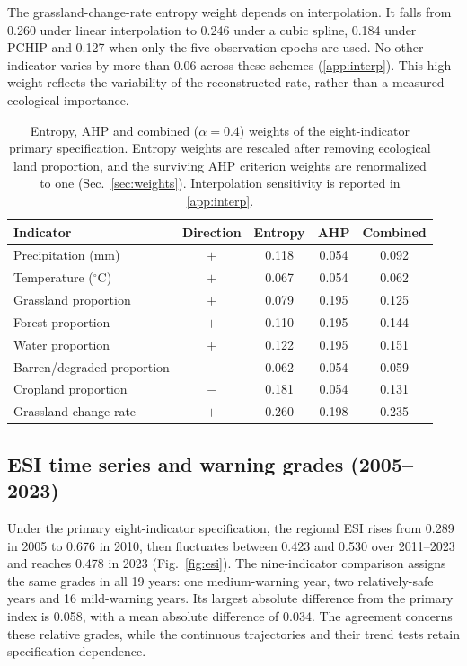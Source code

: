 \documentclass[preprint,11pt,authoryear]{elsarticle}
\begin{document}
The grassland-change-rate entropy weight depends on interpolation. It falls from 0.260 under linear interpolation to 0.246 under a cubic spline, 0.184 under PCHIP and 0.127 when only the five observation epochs are used. No other indicator varies by more than 0.06 across these schemes (\ref{app:interp}). This high weight reflects the variability of the reconstructed rate, rather than a measured ecological importance.

\begin{table}[htbp]
\centering
\caption{Entropy, AHP and combined ($\alpha=0.4$) weights of the eight-indicator primary specification. Entropy weights are rescaled after removing ecological land proportion, and the surviving AHP criterion weights are renormalized to one (Sec.~\ref{sec:weights}). Interpolation sensitivity is reported in \ref{app:interp}.}
\label{tab:weights}
\small
\begin{tabular}{lcccc}
\toprule
Indicator & Direction & Entropy & AHP & Combined \\
\midrule
Precipitation (mm) & $+$ & 0.118 & 0.054 & 0.092 \\
Temperature ($^{\circ}$C) & $+$ & 0.067 & 0.054 & 0.062 \\
Grassland proportion & $+$ & 0.079 & 0.195 & 0.125 \\
Forest proportion & $+$ & 0.110 & 0.195 & 0.144 \\
Water proportion & $+$ & 0.122 & 0.195 & 0.151 \\
Barren/degraded proportion & $-$ & 0.062 & 0.054 & 0.059 \\
Cropland proportion & $-$ & 0.181 & 0.054 & 0.131 \\
Grassland change rate & $+$ & 0.260 & 0.198 & 0.235 \\
\bottomrule
\end{tabular}
\end{table}

\subsection{ESI time series and warning grades (2005--2023)}
\label{sec:esi-series}
Under the primary eight-indicator specification, the regional ESI rises from 0.289 in 2005 to 0.676 in 2010, then fluctuates between 0.423 and 0.530 over 2011--2023 and reaches 0.478 in 2023 (Fig.~\ref{fig:esi}). The nine-indicator comparison assigns the same grades in all 19 years: one medium-warning year, two relatively-safe years and 16 mild-warning years. Its largest absolute difference from the primary index is 0.058, with a mean absolute difference of 0.034. The agreement concerns these relative grades, while the continuous trajectories and their trend tests retain specification dependence.
\end{document}
